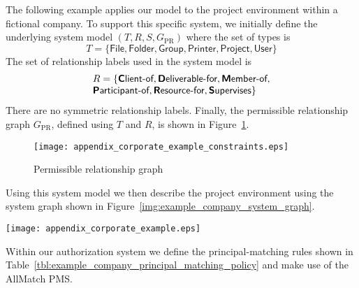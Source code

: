 \documentclass{article}
\begin{document}
The following example applies our model to the project environment within a fictional company. To support this specific system, we initially define the underlying system model $(T,R,S,G_{\textrm{PR}})$ where the set of types is
\[T = \{\textsf{File}, \textsf{Folder}, \textsf{Group}, \textsf{Printer}, \textsf{Project}, \textsf{User}\}\]
The set of relationship labels used in the system model is
\[
    \begin{array}{l}
        R = \{\textsf{\textbf{C}lient-of}, \textsf{\textbf{D}eliverable-for}, \textsf{\textbf{M}ember-of}, \\
        \textsf{\textbf{P}articipant-of}, \textsf{\textbf{R}esource-for}, \textsf{\textbf{S}upervises}\}
    \end{array}
\]
There are no symmetric relationship labels.
Finally, the permissible relationship graph $G_{\textrm{PR}}$, defined using $T$ and $R$, is shown in Figure~\ref{img:example_company_edge_constraints}.

\begin{figure}[!ht]
  \centering
  \texttt{[image: appendix\_corporate\_example\_constraints.eps]}
  \caption{Permissible relationship graph}\label{img:example_company_edge_constraints}
\end{figure}

Using this system model we then describe the project environment using the system graph shown in Figure~\ref{img:example_company_system_graph}.

\begin{figure*}[!ht]
  \centering
  \texttt{[image: appendix\_corporate\_example.eps]}
  \caption{System graph}\label{img:example_company_system_graph}
\end{figure*}

Within our authorization system we define the principal-matching rules shown in Table~\ref{tbl:example_company_principal_matching_policy} and make use of the \textsf{AllMatch} PMS.
\end{document}
